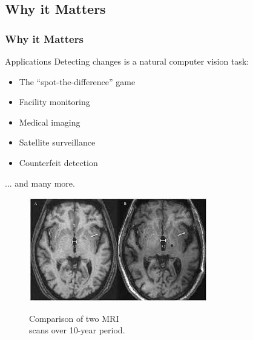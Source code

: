 \documentclass[13.5pt,aspecratio=169, xcolor=dvipsnames]{beamer}
\begin{document}
\subsection{Why it Matters}
\begin{frame}
    \onehalfspacing
        \frametitle{Why it Matters}
        
        \begin{minipage}{0.55\textwidth}
            \begin{minipage}{0.9\textwidth}
            \begin{block}{Applications}
                Detecting changes is a natural computer
                vision task:
                \begin{itemize}
                    \item The “spot-the-difference” game
                    \item Facility monitoring
                    \item Medical imaging
                    \item Satellite surveillance
                    \item Counterfeit detection
                \end{itemize}
                ... and many more.
            \end{block}
        \end{minipage}
        \end{minipage}
        \begin{minipage}{0.4\textwidth}
            \begin{figure}[h]
            \includegraphics[scale=0.55]{Medical_Imaging.jpg}
            \begin{center}
            \hspace{1em} Comparison of two MRI \\ \hspace{1em} scans over 10-year period. 
            \end{center}
            \end{figure}
        \end{minipage}
    \end{frame}
    
\end{document}
